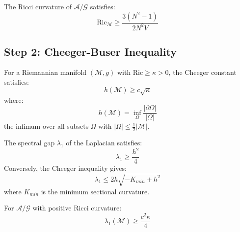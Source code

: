 \begin{corollary}
\label{cor:ricci-lower}
The Ricci curvature of $\mathcal{A}/\mathcal{G}$ satisfies:
\begin{equation}
\mathrm{Ric}_{\mathcal{M}} \geq \frac{3(N^2-1)}{2N^2 V}
\end{equation}
\end{corollary}

\subsection{Step 2: Cheeger-Buser Inequality}

\begin{theorem}
\label{thm:cheeger}
\label{thm:uniform-cheeger}
For a Riemannian manifold $(\mathcal{M}, g)$ with $\mathrm{Ric} \geq \kappa > 0$, 
the Cheeger constant satisfies:
\begin{equation}
h(\mathcal{M}) \geq c \sqrt{\kappa}
\end{equation}
where:
\begin{equation}
h(\mathcal{M}) = \inf_{\Omega} \frac{|\partial \Omega|}{|\Omega|}
\end{equation}
the infimum over all subsets $\Omega$ with $|\Omega| \leq \frac{1}{2}|\mathcal{M}|$.
\end{theorem}

\begin{theorem}
\label{thm:buser}
The spectral gap $\lambda_1$ of the Laplacian satisfies:
\begin{equation}
\lambda_1 \geq \frac{h^2}{4}
\end{equation}
Conversely, the Cheeger inequality gives:
\begin{equation}
\lambda_1 \leq 2h \sqrt{-K_{min} + h^2}
\end{equation}
where $K_{min}$ is the minimum sectional curvature.
\end{theorem}

\begin{corollary}
\label{cor:gap-lower}
For $\mathcal{A}/\mathcal{G}$ with positive Ricci curvature:
\begin{equation}
\lambda_1(\mathcal{M}) \geq \frac{c^2 \kappa}{4}
\end{equation}
\end{corollary}

